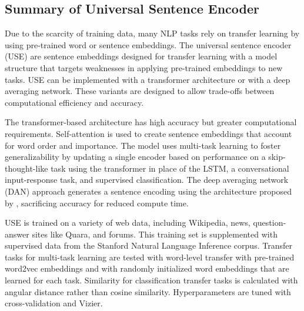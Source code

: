 

\subsection{Summary of Universal Sentence Encoder}

Due to the scarcity of training data, many NLP tasks rely on transfer learning by using pre-trained word or sentence embeddings. The universal sentence encoder (USE) \cite{use} are sentence embeddings designed for transfer learning with a model structure that targets weaknesses in applying pre-trained embeddings to new tasks. USE can be implemented with a transformer architecture or with a deep averaging network. These variants are designed to allow trade-offs between computational efficiency and accuracy. 

The transformer-based architecture has high accuracy but greater computational requirements. Self-attention \cite{attention} is used to create sentence embeddings that account for word order and importance. The model uses multi-task learning to foster generalizability by updating a single encoder based on performance on a skip-thought-like task using the transformer in place of the LSTM, a conversational input-response task, and supervised classification. The deep averaging network (DAN) approach generates a sentence encoding using the architecture proposed by \cite{dan}, sacrificing accuracy for reduced compute time.

USE is trained on a variety of web data, including Wikipedia, news, question-answer sites like Quara, and forums. This training set is supplemented with supervised data from the Stanford Natural Language Inference corpus. Transfer tasks for multi-task learning are tested with word-level transfer with pre-trained word2vec embeddings and with randomly initialized word embeddings that are learned for each task. Similarity for classification transfer tasks is calculated with angular distance rather than cosine similarity. Hyperparameters are tuned with cross-validation and Vizier. 

